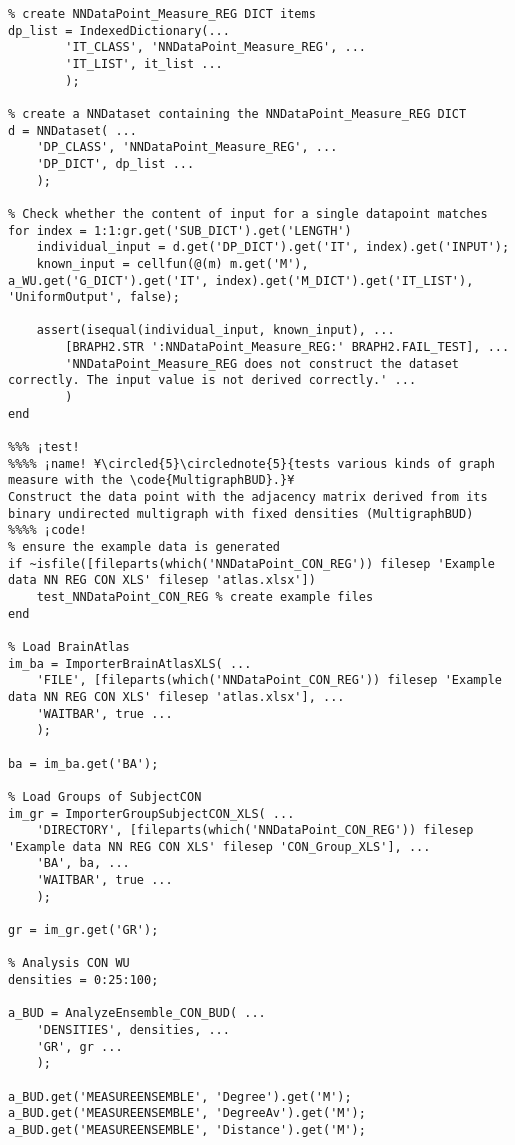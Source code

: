 \documentclass{tufte-handout}
\begin{document}
\begin{lstlisting}
% create NNDataPoint_Measure_REG DICT items
dp_list = IndexedDictionary(...
        'IT_CLASS', 'NNDataPoint_Measure_REG', ...
        'IT_LIST', it_list ...
        );

% create a NNDataset containing the NNDataPoint_Measure_REG DICT
d = NNDataset( ...
    'DP_CLASS', 'NNDataPoint_Measure_REG', ...
    'DP_DICT', dp_list ...
    );

% Check whether the content of input for a single datapoint matches
for index = 1:1:gr.get('SUB_DICT').get('LENGTH')
    individual_input = d.get('DP_DICT').get('IT', index).get('INPUT');
    known_input = cellfun(@(m) m.get('M'), a_WU.get('G_DICT').get('IT', index).get('M_DICT').get('IT_LIST'), 'UniformOutput', false);

    assert(isequal(individual_input, known_input), ...
        [BRAPH2.STR ':NNDataPoint_Measure_REG:' BRAPH2.FAIL_TEST], ...
        'NNDataPoint_Measure_REG does not construct the dataset correctly. The input value is not derived correctly.' ...
        )
end

%%% ¡test!
%%%% ¡name! ¥\circled{5}\circlednote{5}{tests various kinds of graph measure with the \code{MultigraphBUD}.}¥
Construct the data point with the adjacency matrix derived from its binary undirected multigraph with fixed densities (MultigraphBUD)
%%%% ¡code!
% ensure the example data is generated
if ~isfile([fileparts(which('NNDataPoint_CON_REG')) filesep 'Example data NN REG CON XLS' filesep 'atlas.xlsx'])
    test_NNDataPoint_CON_REG % create example files
end

% Load BrainAtlas
im_ba = ImporterBrainAtlasXLS( ...
    'FILE', [fileparts(which('NNDataPoint_CON_REG')) filesep 'Example data NN REG CON XLS' filesep 'atlas.xlsx'], ...
    'WAITBAR', true ...
    );

ba = im_ba.get('BA');

% Load Groups of SubjectCON
im_gr = ImporterGroupSubjectCON_XLS( ...
    'DIRECTORY', [fileparts(which('NNDataPoint_CON_REG')) filesep 'Example data NN REG CON XLS' filesep 'CON_Group_XLS'], ...
    'BA', ba, ...
    'WAITBAR', true ...
    );

gr = im_gr.get('GR');

% Analysis CON WU
densities = 0:25:100;

a_BUD = AnalyzeEnsemble_CON_BUD( ...
    'DENSITIES', densities, ...
    'GR', gr ...
    );

a_BUD.get('MEASUREENSEMBLE', 'Degree').get('M');
a_BUD.get('MEASUREENSEMBLE', 'DegreeAv').get('M');
a_BUD.get('MEASUREENSEMBLE', 'Distance').get('M');


\end{lstlisting}
\end{document}
